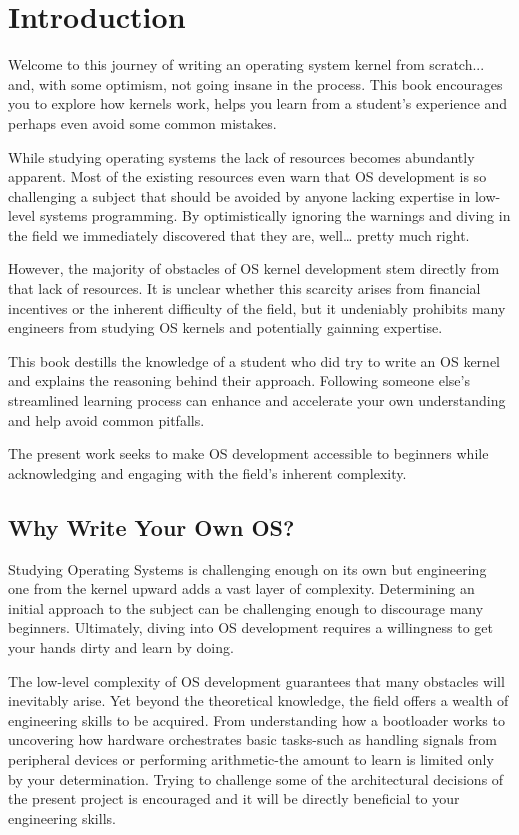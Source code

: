 \chapter{Introduction}

Welcome to this journey of writing an operating system kernel from scratch... and, with some optimism, not going insane in the 
process. This book encourages you to explore how kernels work, helps you learn from a student's experience and 
perhaps even avoid some common mistakes. 

While studying operating systems the lack of resources becomes abundantly apparent. Most of the existing resources even
warn that OS development is so challenging a subject that should be avoided by anyone lacking expertise
in low-level systems programming. By optimistically ignoring the warnings and diving in the field we immediately discovered
that they are, well… pretty much right.

However, the majority of obstacles of OS kernel development stem directly from that lack of resources.
It is unclear whether this scarcity arises from financial incentives or the inherent difficulty of the field, 
but it undeniably prohibits many engineers from studying OS kernels and potentially gainning expertise.

This book destills the knowledge of a student who did try to write an OS kernel and explains the reasoning behind their 
approach. Following someone else's streamlined learning process can enhance and accelerate your own understanding 
and help avoid common pitfalls.

The present work seeks to make OS development accessible to beginners while acknowledging and engaging with the 
field's inherent complexity.

\section{Why Write Your Own OS?}

Studying Operating Systems is challenging enough on its own but engineering one from the kernel upward adds a vast layer of
complexity. Determining an initial approach to the subject can be challenging enough to discourage many beginners. 
Ultimately, diving into OS development requires a willingness to get your hands dirty and learn by doing.

The low-level complexity of OS development guarantees that many obstacles will inevitably arise. 
Yet beyond the theoretical knowledge, the field offers a wealth of engineering skills to be acquired. 
From understanding how a bootloader works to uncovering how hardware orchestrates basic tasks-such as handling 
signals from peripheral devices or performing arithmetic-the amount to learn is limited only by your determination. 
Trying to challenge some of the architectural decisions of the present project is encouraged and it will be directly
beneficial to your engineering skills.

